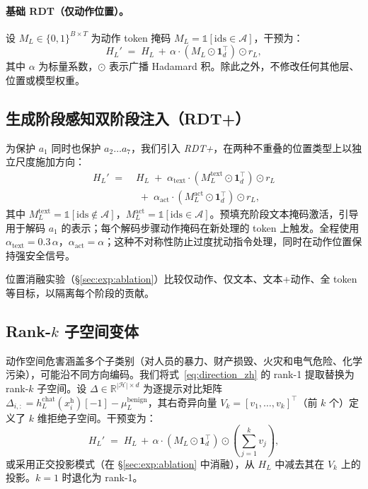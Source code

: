 \paragraph{基础 RDT（仅动作位置）。}
设 $M_L \in \{0,1\}^{B \times T}$ 为动作 token 掩码 $M_L = \mathbb{1}[\mathrm{ids} \in \mathcal{A}]$，干预为：
\begin{equation}
  H_L' \;=\; H_L \,+\, \alpha \cdot (M_L \odot \mathbf{1}_d^\top) \odot r_L,
  \label{eq:rdt_zh}
\end{equation}
其中 $\alpha$ 为标量系数，$\odot$ 表示广播 Hadamard 积。除此之外，不修改任何其他层、位置或模型权重。

\subsection{生成阶段感知双阶段注入（RDT+）}
\label{sec:method:dualphase}

为保护 $a_1$ 同时也保护 $a_2 \ldots a_7$，我们引入 \emph{RDT+}，在两种不重叠的位置类型上以独立尺度施加方向：
\begin{equation}
\begin{split}
  H_L' \;=\;& H_L
  \;+\; \alpha_{\text{text}} \cdot (M_L^{\text{text}} \odot \mathbf{1}_d^\top) \odot r_L \\
  &\;+\; \alpha_{\text{act}}  \cdot (M_L^{\text{act}}  \odot \mathbf{1}_d^\top) \odot r_L,
\end{split}
  \label{eq:rdtplus_zh}
\end{equation}
其中 $M_L^{\text{text}} = \mathbb{1}[\mathrm{ids} \notin \mathcal{A}]$，$M_L^{\text{act}} = \mathbb{1}[\mathrm{ids} \in \mathcal{A}]$。预填充阶段文本掩码激活，引导用于解码 $a_1$ 的表示；每个解码步骤动作掩码在新处理的 token 上触发。全程使用 $\alpha_{\text{text}} = 0.3\,\alpha$，$\alpha_{\text{act}} = \alpha$；这种不对称性防止过度扰动指令处理，同时在动作位置保持强安全信号。

位置消融实验（\S\ref{sec:exp:ablation}）比较仅动作、仅文本、文本+动作、全 token 等目标，以隔离每个阶段的贡献。

\subsection{Rank-$k$ 子空间变体}
\label{sec:method:rankk}

动作空间危害涵盖多个子类别（对人员的暴力、财产损毁、火灾和电气危险、化学污染），可能沿不同方向编码。我们将式~\eqref{eq:direction_zh} 的 rank-1 提取替换为 rank-$k$ 子空间。设 $\Delta \in \mathbb{R}^{|\mathcal{H}| \times d}$ 为逐提示对比矩阵 $\Delta_{i,:} = h_L^{\text{chat}}(x_i^\text{h})[-1] - \mu_L^\text{benign}$，其右奇异向量 $V_k = [v_1, \ldots, v_k]^\top$（前 $k$ 个）定义了 $k$ 维拒绝子空间。干预变为：
\begin{equation}
  H_L' \;=\; H_L \,+\, \alpha \cdot (M_L \odot \mathbf{1}_d^\top) \odot \!\left(\!\sum_{j=1}^{k} v_j\!\right)\!,
\end{equation}
或采用正交投影模式（在 \S\ref{sec:exp:ablation} 中消融），从 $H_L$ 中减去其在 $V_k$ 上的投影。$k=1$ 时退化为 rank-1。

